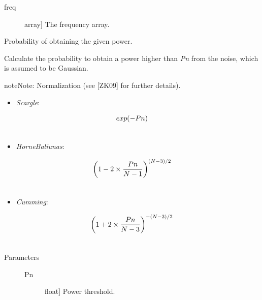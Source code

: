 \documentclass[letterpaper,10pt,english]{sphinxmanual}
\begin{document}
\begin{fulllineitems}
\begin{description}
\begin{description}
\item[{freq}] \leavevmode{[}array{]}
The frequency array.

\end{description}

\end{description}

\begin{fulllineitems}
\label{api:OPEN.periodograms.bls.prob}
Probability of obtaining the given power.

Calculate the probability to obtain a power higher than
\emph{Pn} from the noise, which is assumed to be Gaussian.

\begin{notice}{note}{Note:}
Normalization
(see {[}ZK09{]} for further details).
\begin{itemize}
\item {} 
\emph{Scargle}:

\end{itemize}
\begin{gather}
\begin{split}exp(-Pn)\end{split}\notag\\\begin{split}\end{split}\notag
\end{gather}\begin{itemize}
\item {} 
\emph{HorneBaliunas}:

\end{itemize}
\begin{gather}
\begin{split}\left(1 - 2 \times \frac{Pn}{N-1} \right)^{(N-3)/2}\end{split}\notag\\\begin{split}\end{split}\notag
\end{gather}\begin{itemize}
\item {} 
\emph{Cumming}:

\end{itemize}
\begin{gather}
\begin{split}\left(1+2\times \frac{Pn}{N-3}\right)^{-(N-3)/2}\end{split}\notag\\\begin{split}\end{split}\notag
\end{gather}\end{notice}
\begin{description}
\item[{Parameters}] \leavevmode\begin{description}
\item[{Pn}] \leavevmode{[}float{]}
Power threshold.


\end{description}
\end{description}
\end{fulllineitems}
\end{fulllineitems}
\end{document}
